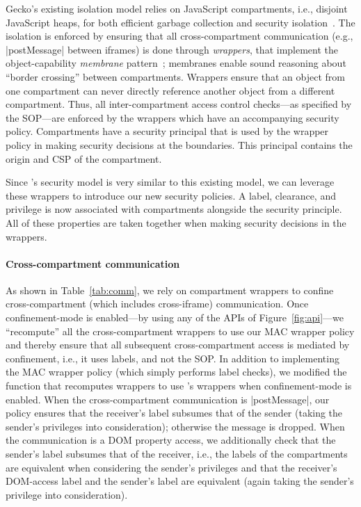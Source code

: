 Gecko's existing isolation model relies on JavaScript compartments, i.e.,
disjoint JavaScript heaps, for both efficient garbage collection and
security isolation~\cite{wagner2011compartmental}.
%
The isolation is enforced by ensuring that all cross-compartment
communication (e.g., \js|postMessage| between iframes) is done through
\emph{wrappers}, that implement the object-capability \emph{membrane}
pattern~\cite{miller2003paradigm,miller2006robust}; membranes enable
sound reasoning about ``border crossing'' between compartments. 
%
Wrappers ensure that an object from one compartment can
never directly reference another object from a different compartment.
%
Thus, all inter-compartment access control checks---as specified by
the SOP---are enforced by the wrappers which have an accompanying
security policy.
%
Compartments have a security
principal that is used by the wrapper policy in making security
decisions at the boundaries.
%
This principal contains the origin and CSP of the compartment.

Since \sys{}'s security model is very similar to this existing
model, we can leverage these wrappers to introduce our new
security policies.
%
A label, clearance, and privilege is now associated with compartments
alongside the security principle.
%
All of these properties are taken together when making security decisions
in the wrappers.

\paragraph{Cross-compartment communication}
%
As shown in Table~\ref{tab:comm}, we rely on compartment wrappers to
confine cross-compartment (which includes cross-iframe) communication.
%
Once confinement-mode is enabled---by using any of the APIs of
Figure~\ref{fig:api}---we ``recompute'' all the cross-compartment
wrappers to use our MAC wrapper policy and thereby ensure that all
subsequent cross-compartment access is mediated by confinement, i.e.,
it uses labels, and not the SOP\@.
%
In addition to implementing the MAC wrapper policy (which simply
performs label checks), we modified the function that recomputes
wrappers to use \sys{}'s wrappers when confinement-mode is enabled.
%
When the cross-compartment communication is \js|postMessage|, our
policy ensures that the receiver's label subsumes that of the sender
(taking the sender's privileges into consideration); otherwise the
message is dropped.
%
When the communication is a DOM property access, we additionally check
that the sender's label subsumes that of the receiver, i.e., the labels of
the compartments are equivalent when considering the sender's
privileges and that the receiver's DOM-access label and the sender's
label are equivalent (again taking the sender's privilege into
consideration).

